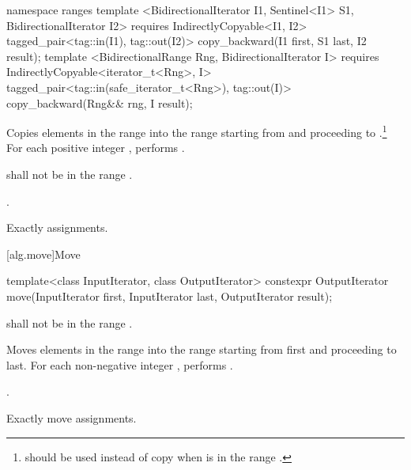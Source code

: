 \begin{addedblock}
%
\begin{itemdecl}
namespace ranges {
  template <BidirectionalIterator I1, Sentinel<I1> S1, BidirectionalIterator I2>
      requires IndirectlyCopyable<I1, I2>
    tagged_pair<tag::in(I1), tag::out(I2)> copy_backward(I1 first, S1 last, I2 result);
  template <BidirectionalRange Rng, BidirectionalIterator I>
      requires IndirectlyCopyable<iterator_t<Rng>, I>
    tagged_pair<tag::in(safe_iterator_t<Rng>), tag::out(I)>
      copy_backward(Rng&& rng, I result);
}
\end{itemdecl}

\begin{itemdescr}
\pnum
\effects
Copies elements in the range 
into the
range 
starting from
and proceeding to .\footnote{
should be used instead of copy when 
is in
the range
.}
For each positive integer
,
performs
.

\pnum
\requires
{}
shall not be in the range
.

\pnum
\returns
{}.

\pnum
\complexity
Exactly
assignments.
\end{itemdescr}
\end{addedblock}

[alg.move]{Move}

%
\begin{itemdecl}
template<class InputIterator, class OutputIterator>
  constexpr OutputIterator move(InputIterator first, InputIterator last,
                                OutputIterator result);
\end{itemdecl}

\begin{itemdescr}
\pnum
\requires
{}
shall not be in the range
.

\pnum
\effects
Moves elements in the range 
into the range 
starting from first and proceeding to last.
For each non-negative integer
,
performs
 .

\pnum
\returns
{}.

\pnum
\complexity
Exactly
move assignments.
\end{itemdescr}

